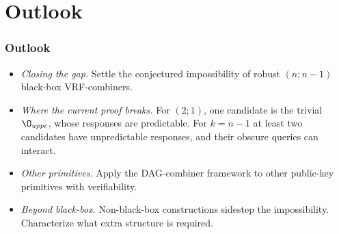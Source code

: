 \section*{Outlook}

\begin{frame}
    \frametitle{Outlook}

    \begin{itemize}
        \item<1-> \emph{Closing the gap.} Settle the conjectured impossibility of robust $(n;n-1)$ black-box VRF-combiners.
        \item<2-> \emph{Where the current proof breaks.} For $(2;1)$, one candidate is the trivial $\O_{uppc}$, whose responses are predictable. For $k = n-1$ at least two candidates have unpredictable responses, and their obscure queries can interact.
        \item<3-> \emph{Other primitives.} Apply the DAG-combiner framework to other public-key primitives with verifiability.
        \item<4-> \emph{Beyond black-box.} Non-black-box constructions sidestep the impossibility. Characterize what extra structure is required.
    \end{itemize}
\end{frame}
